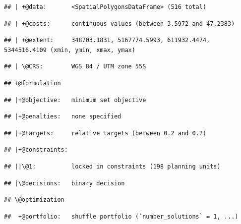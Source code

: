 \documentclass[
  12pt,
]{book}
\begin{document}
\begin{verbatim}
## | +@data:       <SpatialPolygonsDataFrame> (516 total)
\end{verbatim}

\begin{verbatim}
## | +@costs:      continuous values (between 3.5972 and 47.2383)
\end{verbatim}

\begin{verbatim}
## | +@extent:     348703.1831, 5167774.5993, 611932.4474, 5344516.4109 (xmin, ymin, xmax, ymax)
\end{verbatim}

\begin{verbatim}
## | \@CRS:        WGS 84 / UTM zone 55S
\end{verbatim}

\begin{verbatim}
## +@formulation
\end{verbatim}

\begin{verbatim}
## |+@objective:   minimum set objective
\end{verbatim}

\begin{verbatim}
## |+@penalties:   none specified
\end{verbatim}

\begin{verbatim}
## |+@targets:     relative targets (between 0.2 and 0.2)
\end{verbatim}

\begin{verbatim}
## |+@constraints:
\end{verbatim}

\begin{verbatim}
## ||\@1:          locked in constraints (198 planning units)
\end{verbatim}

\begin{verbatim}
## |\@decisions:   binary decision
\end{verbatim}

\begin{verbatim}
## \@optimization
\end{verbatim}

\begin{verbatim}
##  +@portfolio:   shuffle portfolio (`number_solutions` = 1, ...)
\end{verbatim}
\end{document}
